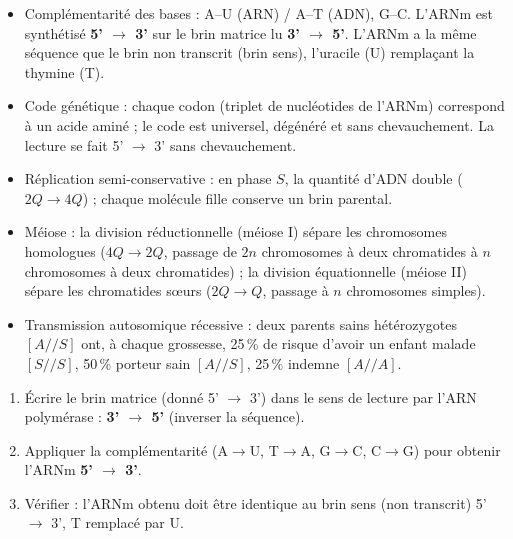 \documentclass[11pt]{article}
\newcommand{\cle}[1]{{\popxbold\color{popdark}#1}}
\begin{document}
\begin{aretenir}
\begin{itemize}
\item \cle{Complémentarité des bases} : A--U (ARN) / A--T (ADN), G--C. L'ARNm est synthétisé \textbf{5' $\rightarrow$ 3'} sur le brin matrice lu \textbf{3' $\rightarrow$ 5'}. L'ARNm a la même séquence que le brin non transcrit (brin sens), l'uracile (U) remplaçant la thymine (T).
\item \cle{Code génétique} : chaque codon (triplet de nucléotides de l'ARNm) correspond à un acide aminé ; le code est universel, dégénéré et sans chevauchement. La lecture se fait 5' $\rightarrow$ 3' sans chevauchement.
\item \cle{Réplication semi-conservative} : en phase $S$, la quantité d'ADN double ($2Q \rightarrow 4Q$) ; chaque molécule fille conserve un brin parental.
\item \cle{Méiose} : la division réductionnelle (méiose I) sépare les chromosomes homologues ($4Q \rightarrow 2Q$, passage de $2n$ chromosomes à deux chromatides à $n$ chromosomes à deux chromatides) ; la division équationnelle (méiose II) sépare les chromatides sœurs ($2Q \rightarrow Q$, passage à $n$ chromosomes simples).
\item Transmission autosomique récessive : deux parents sains hétérozygotes $[A//S]$ ont, à chaque grossesse, \num{25}\,\% de risque d'avoir un enfant malade $[S//S]$, \num{50}\,\% porteur sain $[A//S]$, \num{25}\,\% indemne $[A//A]$.
\end{itemize}
\end{aretenir}

\begin{methode}
\begin{enumerate}
\item Écrire le brin matrice (donné 5' $\rightarrow$ 3') dans le sens de lecture par l'ARN polymérase : \textbf{3' $\rightarrow$ 5'} (inverser la séquence).
\item Appliquer la complémentarité (A$\rightarrow$U, T$\rightarrow$A, G$\rightarrow$C, C$\rightarrow$G) pour obtenir l'ARNm \textbf{5' $\rightarrow$ 3'}.
\item Vérifier : l'ARNm obtenu doit être identique au brin sens (non transcrit) 5' $\rightarrow$ 3', T remplacé par U.
\end{enumerate}
\end{methode}
\end{document}
